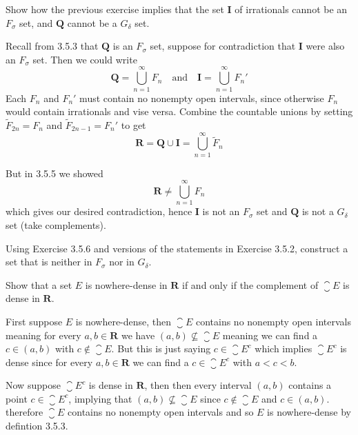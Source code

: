 \begin{exercise}
  Show how the previous exercise implies that the set $\mathbf I$ of irrationals cannot be an $F_{\sigma}$ set, and $\mathbf{Q}$ cannot be a $G_{\delta}$ set.
\end{exercise}

\begin{solution}
  Recall from 3.5.3 that $\mathbf Q$ is an $F_\sigma$ set,
  suppose for contradiction that $\mathbf I$ were also an $F_\sigma$ set. Then we could write
  $$
  \mathbf{Q} = \bigcup_{n=1}^\infty F_n \quad\text{and}\quad \mathbf{I} = \bigcup_{n=1}^\infty F_n'
  $$
  Each $F_n$ and $F_n'$ must contain no nonempty open intervals, since otherwise $F_n$ would contain irrationals and vise versa.
  Combine the countable unions by setting $\tilde F_{2n} = F_n$ and $\tilde F_{2n-1} = F_n'$ to get
  $$
  \mathbf{R} = \mathbf{Q} \cup \mathbf{I} = \bigcup_{n=1}^\infty \tilde F_n
  $$


  But in 3.5.5 we showed
  $$\mathbf{R} \ne \bigcup_{n=1}^\infty F_n$$
  which gives our desired contradiction, hence $\mathbf{I}$ is not an $F_\sigma$ set and $\mathbf{Q}$ is not a $G_{\delta}$ set (take complements).
\end{solution}

\begin{exercise}
  Using Exercise 3.5.6 and versions of the statements in Exercise 3.5.2, construct a set that is neither in $F_{\sigma}$ nor in $G_{\delta}$.
\end{exercise}

\begin{solution}
  \TODO
\end{solution}

\begin{exercise}
  Show that a set $E$ is nowhere-dense in $\mathbf{R}$ if and only if the complement of $\closure{E}$ is dense in $\mathbf{R}$.
\end{exercise}

\begin{solution}
  First suppose $E$ is nowhere-dense, then $\closure{E}$ contains no nonempty open intervals meaning for every $a,b \in \mathbf R$ we have $(a,b) \not \subseteq \closure{E}$ meaning we can find a $c \in (a,b)$ with $c \notin \closure{E}$. But this is just saying $c \in \closure{E}^c$ which implies $\closure{E}^c$ is dense since for every $a,b \in \mathbf R$ we can find a $c \in \closure{E}^c$ with $a < c < b$.

  Now suppose $\closure{E}^c$ is dense in $\mathbf R$, then then every interval $(a,b)$ contains a point $c \in \closure{E}^c$, implying that $(a,b) \not \subseteq \closure{E}$ since $c \notin \closure{E}$ and $c \in (a,b)$. therefore $\closure{E}$ contains no nonempty open intervals and so $E$ is nowhere-dense by defintion 3.5.3.
\end{solution}

